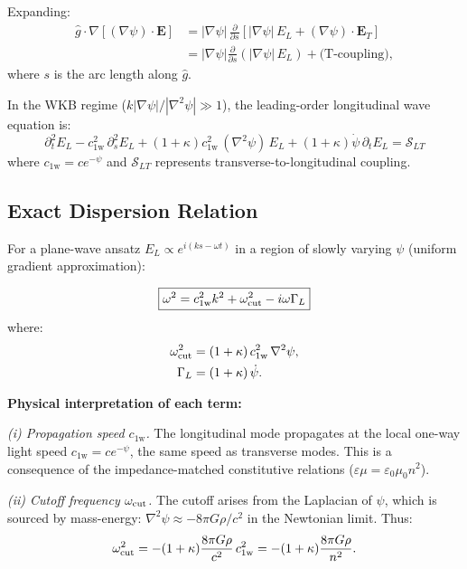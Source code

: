 \documentclass[aps,prd,twocolumn,superscriptaddress,nofootinbib,floatfix]{revtex4-2}
\newcommand{\cfield}{c_{\text{1w}}}
\newcommand{\cvac}{c}
\newcommand{\Evec}{\mathbf{E}}
\newcommand{\calS}{\mathcal{S}}
\begin{document}
Expanding:
\begin{align}
\hat{g}\cdot\nabla[(\nabla\psi)\cdot\Evec] &= |\nabla\psi|\,\frac{\partial}{\partial s}[|\nabla\psi|\,E_L + (\nabla\psi)\cdot\Evec_T] \nonumber\\
&= |\nabla\psi|\frac{\partial}{\partial s}(|\nabla\psi|\,E_L) + \text{(T-coupling)},
\end{align}
where $s$ is the arc length along $\hat{g}$.

In the WKB regime ($k|\nabla\psi|/|\nabla^2\psi| \gg 1$), the
leading-order longitudinal wave equation is:
\begin{equation}
\boxed{
\partial_t^2 E_L - \cfield^2\,\partial_s^2 E_L
+ (1+\kappa)\cfield^2\,(\nabla^2\psi)\,E_L
+ (1+\kappa)\dot\psi\,\partial_t E_L = \calS_{LT}
}
\label{eq:longitudinal-exact}
\end{equation}
where $\cfield = \cvac e^{-\psi}$ and $\calS_{LT}$ represents
transverse-to-longitudinal coupling.

\subsection{Exact Dispersion Relation}

For a plane-wave ansatz $E_L \propto e^{i(ks - \omega t)}$ in a
region of slowly varying $\psi$ (uniform gradient approximation):

\begin{equation}
\boxed{
\omega^2 = \cfield^2 k^2 + \omega_{\rm cut}^2 - i\omega\Gamma_L
}
\label{eq:dispersion-exact}
\end{equation}
where:
\begin{align}
\omega_{\rm cut}^2 &= (1+\kappa)\,\cfield^2\,\nabla^2\psi, \label{eq:cutoff}\\
\Gamma_L &= (1+\kappa)\,\dot\psi. \label{eq:damping}
\end{align}

\textbf{Physical interpretation of each term:}

\textit{(i) Propagation speed $\cfield$.}
The longitudinal mode propagates at the local one-way light
speed $\cfield = \cvac e^{-\psi}$, the same speed as
transverse modes.  This is a consequence of the impedance-matched
constitutive relations ($\varepsilon\mu = \varepsilon_0\mu_0 n^2$).

\textit{(ii) Cutoff frequency $\omega_{\rm cut}$.}
The cutoff arises from the Laplacian of $\psi$, which is
sourced by mass-energy: $\nabla^2\psi \approx -8\pi G\rho/\cvac^2$
in the Newtonian limit.  Thus:
\begin{equation}
\omega_{\rm cut}^2 = -(1+\kappa)\frac{8\pi G\rho}{\cvac^2}\,\cfield^2
= -(1+\kappa)\frac{8\pi G\rho}{n^2}.
\label{eq:cutoff-density}
\end{equation}
\end{document}

